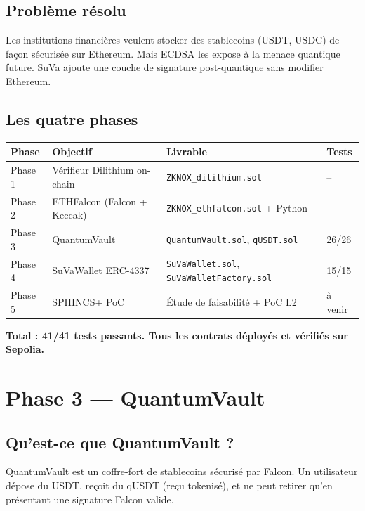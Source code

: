 \documentclass[11pt,a4paper]{article}
\begin{document}
\subsection{Problème résolu}

Les institutions financières veulent stocker des stablecoins (USDT, USDC) de façon sécurisée sur Ethereum. Mais ECDSA les expose à la menace quantique future. SuVa ajoute une couche de signature post-quantique sans modifier Ethereum.

\subsection{Les quatre phases}

\begin{longtable}{@{}p{1.8cm}p{4cm}p{4cm}p{4cm}@{}}
\toprule
\textbf{Phase} & \textbf{Objectif} & \textbf{Livrable} & \textbf{Tests} \\
\midrule
\endhead
Phase 1 & Vérifieur Dilithium on-chain & \texttt{ZKNOX\_dilithium.sol} & -- \\[4pt]
Phase 2 & ETHFalcon (Falcon + Keccak) & \texttt{ZKNOX\_ethfalcon.sol} + Python & -- \\[4pt]
Phase 3 & QuantumVault & \texttt{QuantumVault.sol}, \texttt{qUSDT.sol} & 26/26 \\[4pt]
Phase 4 & SuVaWallet ERC-4337 & \texttt{SuVaWallet.sol}, \texttt{SuVaWalletFactory.sol} & 15/15 \\[4pt]
Phase 5 & SPHINCS+ PoC & Étude de faisabilité + PoC L2 & à venir \\
\bottomrule
\end{longtable}

\textbf{Total : 41/41 tests passants. Tous les contrats déployés et vérifiés sur Sepolia.}

\section{Phase 3 --- QuantumVault}

\subsection{Qu'est-ce que QuantumVault ?}

QuantumVault est un coffre-fort de stablecoins sécurisé par Falcon. Un utilisateur dépose du USDT, reçoit du qUSDT (reçu tokenisé), et ne peut retirer qu'en présentant une signature Falcon valide.
\end{document}
